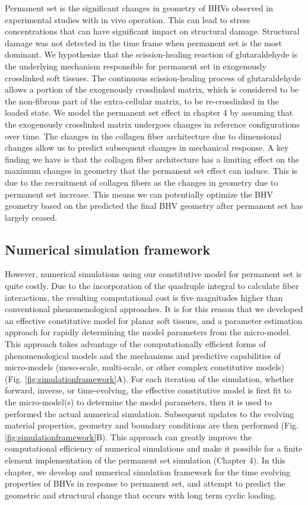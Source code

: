     
    Permanent set is the significant changes in geometry of BHVs observed in experimental studies \cite{smith_fatigue_1999}\cite{smith_high_1997} with in vivo operation. This can lead to stress concentrations that can have significant impact on structural damage. Structural damage was not detected in the time frame when permanent set is the most dominant. We hypothesize that the scission-healing reaction of glutaraldehyde is the underlying mechanism responsible for permanent set in exogenously crosslinked soft tissues. The continuous scission-healing process of glutaraldehyde allows a portion of the exogenously crosslinked matrix, which is considered to be the non-fibrous part of the extra-cellular matrix, to be re-crosslinked in the loaded state. We model the permanent set effect in chapter 4 by assuming that the exogenously crosslinked matrix undergoes changes in reference configurations over time. The changes in the collagen fiber architecture due to dimensional changes allow us to predict subsequent changes in mechanical response. A key finding we have is that the collagen fiber architecture has a limiting effect on the maximum changes in geometry that the permanent set effect can induce. This is due to the recruitment of collagen fibers as the changes in geometry due to permanent set increase. This means we can potentially optimize the BHV geometry based on the predicted the final BHV geometry after permanent set has largely ceased. 
    

\subsection{Numerical simulation framework}

    However, numerical simulations using our constitutive model for permanent set is quite costly. Due to the incorporation of the quadruple integral to calculate fiber interactions, the resulting computational cost is five magnitudes higher than conventional phenomenological approaches. It is for this reason that we developed an effective constitutive model for planar soft tissues, and a parameter estimation approach for rapidly determining the model parameters from the micro-model. This approach takes advantage of the computationally efficient forms of phenomenological models and the mechanisms and predictive capabilities of micro-models (meso-scale, multi-scale, or other complex constitutive models) (Fig. \ref{fig:simulationframework}A). For each iteration of the simulation, whether forward, inverse, or time-evolving, the effective constitutive model is first fit to the micro-model(s) to determine the model parameters, then it is used to performed the actual numerical simulation. Subsequent updates to the evolving material properties, geometry and boundary conditions are then performed (Fig. \ref{fig:simulationframework}B). This approach can greatly improve the computational efficiency of numerical simulations and make it possible for a finite element implementation of the permanent set simulation (Chapter 4). In this chapter, we develop and numerical simulation framework for the time evolving properties of BHVs in response to permanent set, and attempt to predict the geometric and structural change that occurs with long term cyclic loading. 
    
